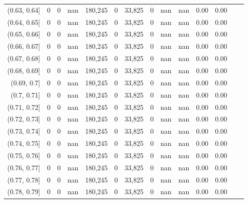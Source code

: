 \begin{tabular}{rrrrrrrrrrrrrr}
(0.63, 0.64]   &        0 &       0 &    nan &  180,245 &        0 &  33,825 &       0 &   nan &   nan &  0.00 &      0.00 \\
(0.64, 0.65]   &        0 &       0 &    nan &  180,245 &        0 &  33,825 &       0 &   nan &   nan &  0.00 &      0.00 \\
(0.65, 0.66]   &        0 &       0 &    nan &  180,245 &        0 &  33,825 &       0 &   nan &   nan &  0.00 &      0.00 \\
(0.66, 0.67]   &        0 &       0 &    nan &  180,245 &        0 &  33,825 &       0 &   nan &   nan &  0.00 &      0.00 \\
(0.67, 0.68]   &        0 &       0 &    nan &  180,245 &        0 &  33,825 &       0 &   nan &   nan &  0.00 &      0.00 \\
(0.68, 0.69]   &        0 &       0 &    nan &  180,245 &        0 &  33,825 &       0 &   nan &   nan &  0.00 &      0.00 \\
(0.69, 0.7]    &        0 &       0 &    nan &  180,245 &        0 &  33,825 &       0 &   nan &   nan &  0.00 &      0.00 \\
(0.7, 0.71]    &        0 &       0 &    nan &  180,245 &        0 &  33,825 &       0 &   nan &   nan &  0.00 &      0.00 \\
(0.71, 0.72]   &        0 &       0 &    nan &  180,245 &        0 &  33,825 &       0 &   nan &   nan &  0.00 &      0.00 \\
(0.72, 0.73]   &        0 &       0 &    nan &  180,245 &        0 &  33,825 &       0 &   nan &   nan &  0.00 &      0.00 \\
(0.73, 0.74]   &        0 &       0 &    nan &  180,245 &        0 &  33,825 &       0 &   nan &   nan &  0.00 &      0.00 \\
(0.74, 0.75]   &        0 &       0 &    nan &  180,245 &        0 &  33,825 &       0 &   nan &   nan &  0.00 &      0.00 \\
(0.75, 0.76]   &        0 &       0 &    nan &  180,245 &        0 &  33,825 &       0 &   nan &   nan &  0.00 &      0.00 \\
(0.76, 0.77]   &        0 &       0 &    nan &  180,245 &        0 &  33,825 &       0 &   nan &   nan &  0.00 &      0.00 \\
(0.77, 0.78]   &        0 &       0 &    nan &  180,245 &        0 &  33,825 &       0 &   nan &   nan &  0.00 &      0.00 \\
(0.78, 0.79]   &        0 &       0 &    nan &  180,245 &        0 &  33,825 &       0 &   nan &   nan &  0.00 &      0.00 \\

\end{tabular}
